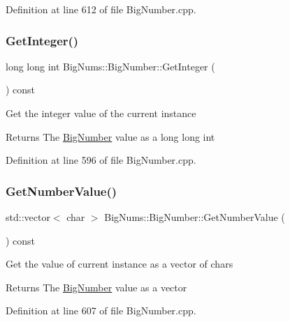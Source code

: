 Definition at line 612 of file Big\+Number.\+cpp.

\mbox{\label{class_big_nums_1_1_big_number_a4fb18fef2725c13a977ef6545563e361}} 
\subsubsection{\texorpdfstring{GetInteger()}{GetInteger()}}
{\footnotesize\ttfamily long long int Big\+Nums\+::\+Big\+Number\+::\+Get\+Integer (\begin{DoxyParamCaption}{ }\end{DoxyParamCaption}) const}

Get the integer value of the current instance \begin{DoxyReturn}{Returns}
The \mbox{\hyperlink{class_big_nums_1_1_big_number}{Big\+Number}} value as a long long int 
\end{DoxyReturn}


Definition at line 596 of file Big\+Number.\+cpp.

\mbox{\label{class_big_nums_1_1_big_number_af8f5505982e08fb73817cba94e70ff1c}} 
\subsubsection{\texorpdfstring{GetNumberValue()}{GetNumberValue()}}
{\footnotesize\ttfamily std\+::vector$<$ char $>$ Big\+Nums\+::\+Big\+Number\+::\+Get\+Number\+Value (\begin{DoxyParamCaption}{ }\end{DoxyParamCaption}) const}

Get the value of current instance as a vector of chars \begin{DoxyReturn}{Returns}
The \mbox{\hyperlink{class_big_nums_1_1_big_number}{Big\+Number}} value as a vector 
\end{DoxyReturn}


Definition at line 607 of file Big\+Number.\+cpp.

\mbox{\label{class_big_nums_1_1_big_number_a1f81565a354b88000e6fa6657bd138c6}} 

